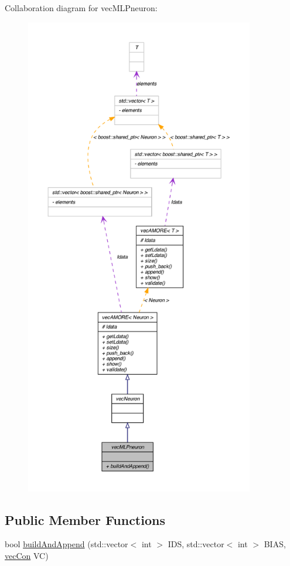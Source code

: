 Collaboration diagram for vecMLPneuron:
\nopagebreak
\begin{figure}[H]
\begin{center}
\leavevmode
\includegraphics[height=600pt]{classvec_m_l_pneuron__coll__graph}
\end{center}
\end{figure}
\subsection*{Public Member Functions}
\begin{DoxyCompactItemize}
\item 
bool \hyperlink{classvec_m_l_pneuron_a8f9e8ee0deffd9eaafe25d4d3e3ebb3f}{buildAndAppend} (std::vector$<$ int $>$ IDS, std::vector$<$ int $>$ BIAS, \hyperlink{classvec_con}{vecCon} VC)
\end{DoxyCompactItemize}


